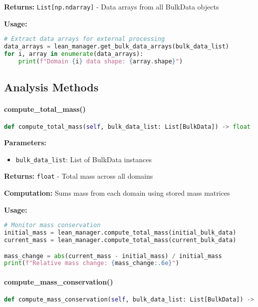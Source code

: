 \textbf{Returns:} \texttt{List[np.ndarray]} - Data arrays from all BulkData objects

\textbf{Usage:}
\begin{lstlisting}[language=Python, caption=Get Arrays Usage]
# Extract data arrays for external processing
data_arrays = lean_manager.get_bulk_data_arrays(bulk_data_list)
for i, array in enumerate(data_arrays):
    print(f"Domain {i} data shape: {array.shape}")
\end{lstlisting}

\subsection{Analysis Methods}
\label{subsec:analysis_methods}

\paragraph{compute\_total\_mass()}\leavevmode
\begin{lstlisting}[language=Python, caption=Compute Total Mass Method]
def compute_total_mass(self, bulk_data_list: List[BulkData]) -> float
\end{lstlisting}

\textbf{Parameters:}
\begin{itemize}
    \item \texttt{bulk\_data\_list}: List of BulkData instances
\end{itemize}

\textbf{Returns:} \texttt{float} - Total mass across all domains

\textbf{Computation:} Sums mass from each domain using stored mass matrices

\textbf{Usage:}
\begin{lstlisting}[language=Python, caption=Mass Computation Usage]
# Monitor mass conservation
initial_mass = lean_manager.compute_total_mass(initial_bulk_data)
current_mass = lean_manager.compute_total_mass(current_bulk_data)

mass_change = abs(current_mass - initial_mass) / initial_mass
print(f"Relative mass change: {mass_change:.6e}")
\end{lstlisting}

\paragraph{compute\_mass\_conservation()}\leavevmode
\begin{lstlisting}[language=Python, caption=Mass Conservation Method]
def compute_mass_conservation(self, bulk_data_list: List[BulkData]) -> float
\end{lstlisting}

